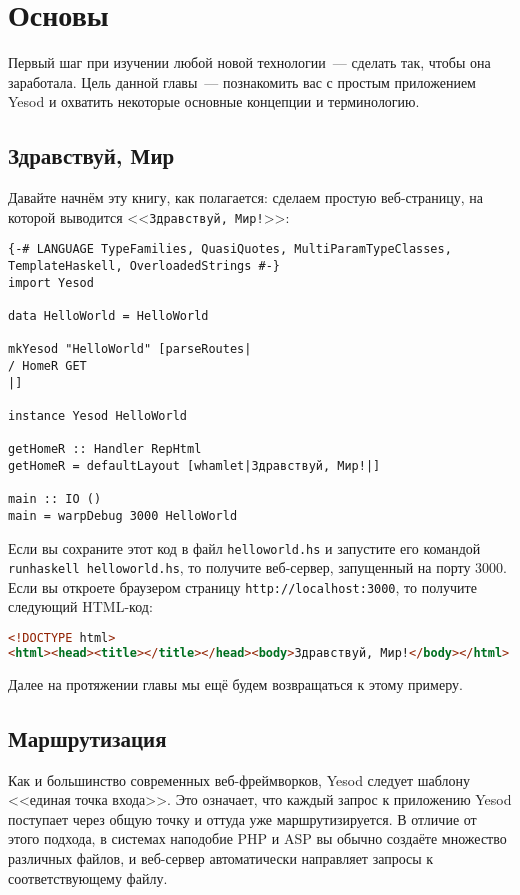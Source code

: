 \chapter{Основы}\label{chap:basics}

Первый шаг при изучении любой новой технологии~--- сделать так, чтобы она заработала. Цель
данной главы~--- познакомить вас с простым приложением Yesod и охватить некоторые основные
концепции и терминологию.

\section{Здравствуй, Мир}

Давайте начнём эту книгу, как полагается: сделаем простую веб-страницу, на которой
выводится <<\texttt{Здравствуй, Мир!}>>:

\begin{lstlisting}
{-# LANGUAGE TypeFamilies, QuasiQuotes, MultiParamTypeClasses, TemplateHaskell, OverloadedStrings #-}
import Yesod

data HelloWorld = HelloWorld

mkYesod "HelloWorld" [parseRoutes|
/ HomeR GET
|]

instance Yesod HelloWorld

getHomeR :: Handler RepHtml
getHomeR = defaultLayout [whamlet|Здравствуй, Мир!|]

main :: IO ()
main = warpDebug 3000 HelloWorld
\end{lstlisting}

Если вы сохраните этот код в файл \lstinline!helloworld.hs! и запустите его командой
\lstinline!runhaskell helloworld.hs!, то получите веб-сервер, запущенный на порту 3000.
Если вы откроете браузером страницу \lstinline'http://localhost:3000', то получите
следующий HTML-код:

\begin{lstlisting}[language=HTML]
<!DOCTYPE html>
<html><head><title></title></head><body>Здравствуй, Мир!</body></html>
\end{lstlisting}

Далее на протяжении главы мы ещё будем возвращаться к этому примеру.

\section{Маршрутизация}

Как и большинство современных веб-фреймворков, Yesod следует шаблону <<единая точка
входа>>. Это означает, что каждый запрос к приложению Yesod поступает через общую точку и
оттуда уже маршрутизируется. В отличие от этого подхода, в системах наподобие PHP и ASP вы
обычно создаёте множество различных файлов, и веб-сервер автоматически направляет запросы
к соответствующему файлу.

